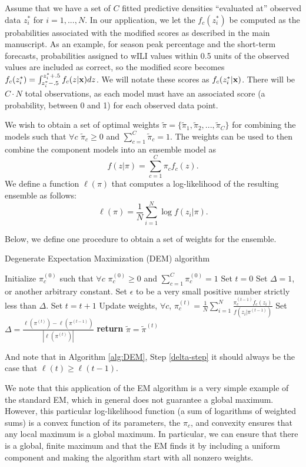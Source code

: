 \documentclass{article}\usepackage[]{graphicx}\usepackage[]{color}
\begin{document}
Assume that we have a set of $C$ fitted predictive densities ``evaluated at'' observed data  $z_i^*$ for $i=1, ..., N$.
In our application, we let the $f_c(z_i^*)$ be computed as the probabilities associated with the modified scores as described in the main manuscript.
As an example, for season peak percentage and the short-term forecasts, probabilities assigned to wILI values within 0.5 units of the observed values are included as correct, so the modified score becomes $f_c(z_i^*) = \int_{z_i^* -.5}^{z_i^* + .5} f_c(z|{\bf{x}})dz$.
We will notate these scores as  $f_{c}(z_i^*|{\bf x})$. There will be $C\cdot N$ total observations, as each model must have an associated score (a probability, between 0 and 1) for each observed data point.

We wish to obtain a set of optimal weights $\tilde\pi = \{\tilde\pi_1, \tilde\pi_2, ..., \tilde\pi_C\}$ for combining the models such that $\forall c$ $\tilde\pi_c \geq 0$ and $\sum_{c=1}^C \tilde\pi_c=1$.
The weights can be used to then combine the component models into an ensemble model as
$$f(z|\pi) = \sum_{c=1}^C \pi_c f_c(z).$$
We define a function $\ell(\pi)$ that computes a log-likelihood of the resulting ensemble as follows:
$$\ell(\pi) = \frac{1}{N}\sum_{i=1}^N \log f(z_i|\pi).$$

Below, we define one procedure to obtain a set of weights for the ensemble.

\begin{algorithm}
\caption{Degenerate Expectation Maximization (DEM) algorithm}\label{alg:DEM}
\begin{algorithmic}[1]
\State Initialize $\pi_c^{(0)}$ such that $\forall c$ $\pi_c^{(0)} \geq 0$ and $\sum_{c=1}^C \pi_c^{(0)}=1$ 
\State Set $t=0$
\State Set $\Delta=1$, or another arbitrary constant.
\State Set $\epsilon$ to be a very small positive number strictly less than $\Delta$.
\While{$ \Delta > \epsilon$}%
\State Set $t=t+1$
\State Update weights, $\forall c$, $\pi_c^{(t)} = \frac{1}{N}\sum_{i=1}^N \frac{\pi_c^{(t-1)}f_c(z_i)}{f(z_i|\pi^{(t-1)})}$
\State Set $\Delta =  \frac{\ell(\pi^{(t)}) - \ell(\pi^{(t-1)})}{|\ell(\pi^{(t)})|}$ \label{delta-step}
\EndWhile
\State \textbf{return} $\tilde\pi = \tilde\pi^{(t)}$%
\EndProcedure
\end{algorithmic}
\end{algorithm}

And note that in Algorithm \ref{alg:DEM}, Step \ref{delta-step} it should always be the case that $\ell(t) \geq \ell(t-1)$.

We note that this application of the EM algorithm is a very simple example of the standard EM, which in general does not guarantee a global maximum. 
However, this particular log-likelihood function (a sum of logarithms of weighted sums) is a convex function of its parameters, the $\pi_c$, and convexity ensures that any local maximum is a global maximum.  
In particular, we can ensure that there is a global, finite maximum and that the EM finds it by including a uniform component and making the algorithm start with all nonzero weights.




\end{document}
